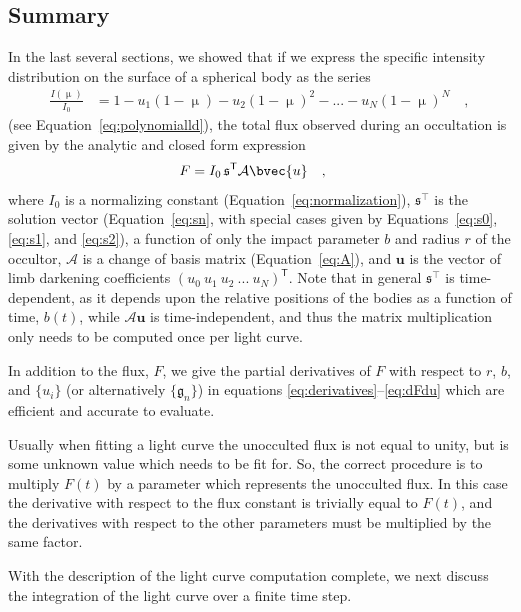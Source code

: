 \documentclass[modern,trackchanges]{aastex63}
\begin{document}
%
\pagebreak %

\subsection{Summary}
\label{sec:summary}
In the last several sections, we showed that if we express the specific intensity distribution
on the surface of a spherical body as the series
%
\begin{align}
\frac{I(\upmu)}{I_0} &= 1 - u_1 (1 - \upmu) - u_2 (1 - \upmu)^2 - ... - u_{N}(1 - \upmu)^{N} \quad,
\end{align}
%
(see Equation~\ref{eq:polynomialld}),
the total flux observed during an occultation is given by the analytic and closed form
expression
%
\begin{align}
    \label{eq:occint_greens_summary}
    F &= I_0 \, \mathfrak{s}^\mathsf{T} \mathcal{A} \bvec{u} \quad ,
\end{align}
%
where $I_0$ is a normalizing constant (Equation~\ref{eq:normalization}),
$\mathfrak{s}^\top$ is the solution vector (Equation~\ref{eq:sn}, with special
cases given by Equations~\ref{eq:s0}, \ref{eq:s1}, and \ref{eq:s2}),
a function of only the impact parameter
$b$ and radius $r$ of the occultor, $\mathcal{A}$ is a change of basis
matrix (Equation~\ref{eq:A}), and $\mathbf{u}$ is the vector of limb
darkening coefficients $(u_0 \ u_1 \ u_2 \ ... \ u_N)^\mathsf{T}$.
Note that in general $\mathfrak{s}^\top$ is time-dependent, as it depends
upon the relative positions of the bodies as a function of time, $b(t)$, while
$\mathcal{A}\mathbf{u}$ is time-independent, and thus the matrix
multiplication only needs to be computed once per light curve.

In addition to the flux, $F$, we give the partial derivatives of $F$ with respect
to $r$, $b$, and $\{u_i\}$ (or alternatively $\{\mathfrak{g}_n\}$) in
equations \ref{eq:derivatives}--\ref{eq:dFdu} which are efficient and
accurate to evaluate.

Usually when fitting a light curve the unocculted flux is not equal
to unity, but is some unknown value which needs to be fit for.  
So, the correct procedure is to multiply $F(t)$ by a parameter which 
represents the unocculted flux.
In this case the derivative with respect to the flux constant is trivially 
equal to $F(t)$, and the derivatives with respect to the other parameters 
must be multiplied by the same factor.

With the description of the light curve computation complete, we next discuss
the integration of the light curve over a finite time step.
\end{document}
